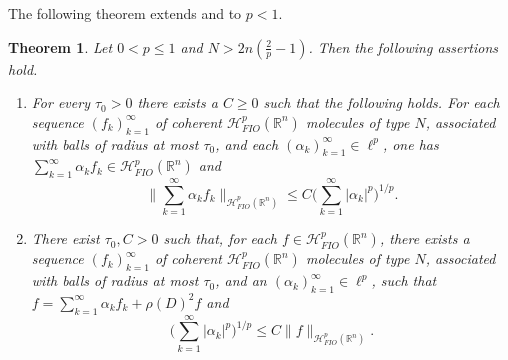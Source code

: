 \documentclass{amsart}
\newcommand {\Hp}{\mathcal{H}^{p}_{FIO}(\Rn)}
\newcommand {\Rn}{\mathbb{R}^{n}}
\newtheorem{theorem}{Theorem}[section]
\theoremstyle{definition}
\numberwithin{equation}{section}
\begin{document}
The following theorem extends \cite[Theorem 3.6]{Smith98a} and \cite[Theorem 8.3]{HaPoRo20} to $p<1$. %

\begin{theorem}\label{thm:moldecomp}
Let $0<p\leq 1$ and $N>2n(\frac{2}{p}-1)$. Then the following assertions hold.
\begin{enumerate}
\item\label{it:moldecomp1} For every $\tau_{0}>0$ there exists a $C\geq 0$ such that the following holds. For 
each sequence $(f_{k})_{k=1}^{\infty}$ of coherent $\Hp$ molecules of type $N$, associated with balls of radius at most $\tau_{0}$, 
and each $(\alpha_{k})_{k=1}^{\infty}\in\ell^{p}$, one has $\sum_{k=1}^{\infty}\alpha_{k}f_{k}\in\Hp$ and
\[
\Big\|\sum_{k=1}^{\infty}\alpha_{k}f_{k}\Big\|_{\Hp}\leq C\Big(\sum_{k=1}^{\infty}|\alpha_{k}|^{p}\Big)^{1/p}.
\]
\item\label{it:moldecomp2} There exist $\tau_{0},C>0$ such that, for each $f\in\Hp$, there exists a sequence $(f_{k})_{k=1}^{\infty}$ of coherent $\Hp$ molecules of type $N$, associated with balls of radius at most $\tau_{0}$, 
and an $(\alpha_{k})_{k=1}^{\infty}\in \ell^{p}$, such that $f=\sum_{k=1}^{\infty}\alpha_{k}f_{k}+\rho(D)^{2}f$ and
\[
\Big(\sum_{k=1}^{\infty}|\alpha_{k}|^{p}\Big)^{1/p}\leq C\|f\|_{\Hp}.%
\]
\end{enumerate}
\end{theorem}
\end{document}
